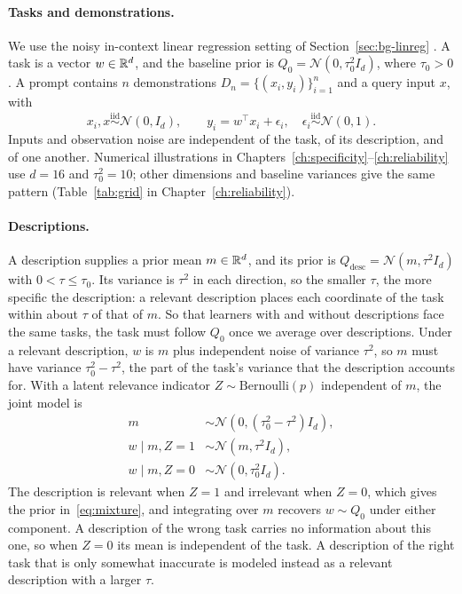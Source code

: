\paragraph{Tasks and demonstrations.}
We use the noisy in-context linear regression setting of Section~\ref{sec:bg-linreg} \citep{garg2022,raventos2023}. A task is a vector $w\in\mathbb{R}^d$, and the baseline prior is $Q_0=\mathcal{N}(0,\tau_0^2I_d)$, where $\tau_0>0$. A prompt contains $n$ demonstrations $D_n=\{(x_i,y_i)\}_{i=1}^n$ and a query input $x$, with
\[
x_i,x\overset{\mathrm{iid}}{\sim}\mathcal{N}(0,I_d),\qquad
y_i=w^\top x_i+\epsilon_i,\quad
\epsilon_i\overset{\mathrm{iid}}{\sim}\mathcal{N}(0,1).
\]
Inputs and observation noise are independent of the task, of its description, and of one another. Numerical illustrations in Chapters~\ref{ch:specificity}--\ref{ch:reliability} use $d=16$ and $\tau_0^2=10$; other dimensions and baseline variances give the same pattern (Table~\ref{tab:grid} in Chapter~\ref{ch:reliability}).

\paragraph{Descriptions.}
A description supplies a prior mean $m\in\mathbb{R}^d$, and its prior is $Q_{\mathrm{desc}}=\mathcal{N}(m,\tau^2I_d)$ with $0<\tau\leq\tau_0$. Its variance is $\tau^2$ in each direction, so the smaller $\tau$, the more specific the description: a relevant description places each coordinate of the task within about $\tau$ of that of $m$. So that learners with and without descriptions face the same tasks, the task must follow $Q_0$ once we average over descriptions. Under a relevant description, $w$ is $m$ plus independent noise of variance $\tau^2$, so $m$ must have variance $\tau_0^2-\tau^2$, the part of the task's variance that the description accounts for. With a latent relevance indicator $Z\sim\mathrm{Bernoulli}(p)$ independent of $m$, the joint model is
\begin{align*}
m&\sim\mathcal{N}(0,(\tau_0^2-\tau^2)I_d),\\
w\mid m,Z=1&\sim\mathcal{N}(m,\tau^2I_d),\\
w\mid m,Z=0&\sim\mathcal{N}(0,\tau_0^2I_d).
\end{align*}
The description is relevant when $Z=1$ and irrelevant when $Z=0$, which gives the prior in~\eqref{eq:mixture}, and integrating over $m$ recovers $w\sim Q_0$ under either component. A description of the wrong task carries no information about this one, so when $Z=0$ its mean is independent of the task. A description of the right task that is only somewhat inaccurate is modeled instead as a relevant description with a larger $\tau$.

